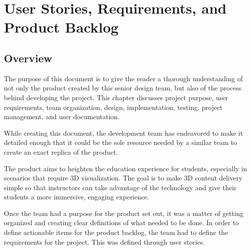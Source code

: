 
\chapter{User Stories,  Requirements, and Product Backlog}



\section{Overview}


The purpose of this document is to give the reader a thorough understanding of
not only the product created by this senior design team, but also of the
process behind developing the project. This chapter discusses project purpose, user
requirements, team organization, design, implementation, testing, project
management, and user documentation.

While creating this document, the development team has endeavored to make it detailed enough that it could be the sole resource needed by a similar team to create an exact replica of the product.

The product aims to heighten the education experience for
students, especially in scenarios that require 3D visualization. The goal is to
make 3D content delivery simple so that instructors can take advantage of the
technology and give their students a more immersive, engaging experience.

Once the team had a purpose for the product set out, it was a matter of getting
organized and creating clear definitions of what needed to be done.
In order to define actionable items for the product backlog, the team had to define
the requirements for the project. This was defined through user stories.




